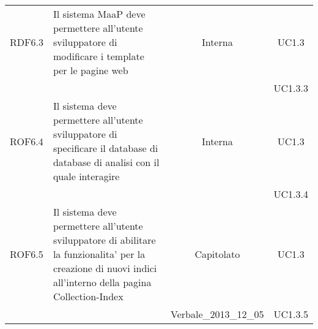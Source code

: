 \begin{longtable}{|c|p{6cm}|c|c|}
\midrule
RDF6.3
& Il sistema MaaP deve permettere all'utente sviluppatore di modificare i template per le pagine web
& Interna
& UC1.3\\
& & & UC1.3.3
\\

\midrule
ROF6.4
& Il sistema deve permettere all'utente sviluppatore di specificare il database di database di analisi con il quale interagire
& Interna
& UC1.3\\
& & & UC1.3.4
\\

\midrule
ROF6.5
& Il sistema deve permettere all'utente sviluppatore di abilitare la funzionalita' per la creazione di nuovi indici all'interno della pagina Collection-Index
& Capitolato
& UC1.3\\
& & Verbale\_2013\_12\_05 & UC1.3.5 
\\


\end{longtable}

\newpage
